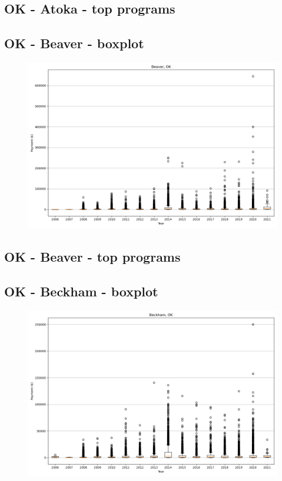 \subsection*{OK - Atoka - top programs}

\newpage
\subsection*{OK - Beaver - boxplot}
\begin{figure}[h]
\centering
\includegraphics[width=7in]{../output/boxplots/counties/Beaver-OK_boxplot.png}
\end{figure}


\subsection*{OK - Beaver - top programs}

\newpage
\subsection*{OK - Beckham - boxplot}
\begin{figure}[h]
\centering
\includegraphics[width=7in]{../output/boxplots/counties/Beckham-OK_boxplot.png}
\end{figure}


